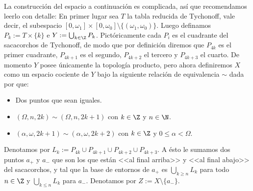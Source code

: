 \documentclass[topologia-analisis.tex]{subfiles}
\begin{document}
\begin{exn}\label{ex:tychonoff_corkscrew}
	La construcción del espacio a continuación es complicada, así que recomendamos leerlo con detalle:
	En primer lugar sea $T$ la tabla reducida de Tychonoff, vale decir, el subespacio $[0, \omega_1] \times [0, \omega_0] \setminus \{(\omega_1, \omega_0)\}$.
	Luego definamos $P_k := T \times \{k\}$ e $Y := \bigcup_{k\in\Z} P_k$.
	Pictóricamente cada $P_i$ es el cuadrante del sacacorchos de Tychonoff, de modo que por definición diremos que
	$P_{4k}$ es el primer cuadrante, $P_{4k + 1}$ es el segundo, $P_{4k + 2}$ el tercero y $P_{4k + 3}$ el cuarto.
	De momento $Y$ posee únicamente la topología producto, pero ahora definiremos $X$ como un espacio cociente de $Y$ bajo la siguiente relación
	de equivalencia $\sim$ dada por que:
	\begin{itemize}
		\item Dos puntos que sean iguales.
		\item $(\Omega, n, 2k) \sim (\Omega, n, 2k+1)$ con $k \in \Z$ y $n \in \N$.
		\item $(\alpha, \omega, 2k+1) \sim (\alpha, \omega, 2k+2)$ con $k \in \Z$ y $0 \le \alpha < \Omega$.
	\end{itemize}
	Denotamos por $L_k := P_{4k} \cup P_{4k+1} \cup P_{4k+2} \cup P_{4k+3}$.
	A ésto le sumamos dos puntos $a_+$ y $a_-$ que son los que están <<al final arriba>> y <<al final abajo>> del sacacorchos,
	y tal que la base de entornos de $a_+$ es $\bigcup_{k \ge n} L_k$ para todo $n\in\Z$ y $\bigcup_{k \le n} L_k$ para $a_-$.
	Denotamos por $Z := X \setminus \{a_-\}$.
\end{exn}

\end{document}
